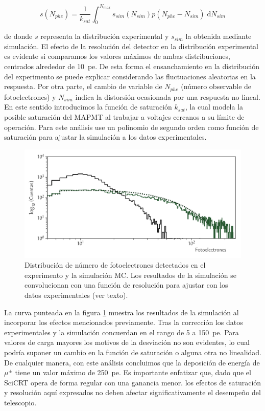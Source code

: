 \begin{equation}
\label{equ:nphe}
s(N_{phe})=\frac{1}{k_{sat}}\int_{0}^{N_{max}} s_{sim}(N_{sim})p(N_{phe}-N_{sim})\;\mathrm{d}N_{sim}
\end{equation}

de donde $s$ representa la distribución experimental y $s_{sim}$ la obtenida mediante simulación. El efecto de la resolución del detector en la distribución experimental es evidente si comparamos los valores máximos de ambas distribuciones, centrados alrededor de \SI{10}{pe}. De esta forma el ensanchamiento en la distribución del experimento se puede explicar considerando las fluctuaciones aleatorias en la respuesta. Por otra parte, el cambio de variable de $N_{phe}$ (número observable de fotoelectrones) y $N_{sim}$ indica la distorsión ocasionada por una respuesta no lineal. En este sentido introducimos la función de saturación $k_{sat}$, la cual modela la posible saturación del MAPMT al trabajar a voltajes cercanos a su límite de operación. Para este análisis use un polinomio de segundo orden como función de saturación para ajustar la simulación a los datos experimentales.

\begin{figure}
        \centering
        \includegraphics[width=\textwidth]{photons-number.pdf}
        \caption{Distribución de número de fotoelectrones detectados en el experimento y la simulación MC. Los resultados de la simulación se convolucionan con una función de resolución para ajustar con los datos experimentales (ver texto).}
        \label{fig:photons-number}
\end{figure}

La curva punteada en la figura \ref{fig:photons-number} muestra los resultados de la simulación al incorporar los efectos mencionados previamente. Tras la corrección los datos experimentales y la simulación concuerdan en el rango de \num{5} a \SI{150}{pe}. Para valores de carga mayores los motivos de la desviación no son evidentes, lo cual podría suponer un cambio en la función de saturación o alguna otra no linealidad. De cualquier manera, con este análisis concluimos que la deposición de energía de $\mu^{\pm}$ tiene un valor máximo de \SI{250}{pe}. Es importante enfatizar que, dado que el SciCRT opera de forma regular con una ganancia menor. los efectos de saturación y resolución aquí expresados no deben afectar significativamente el desempeño del telescopio.
